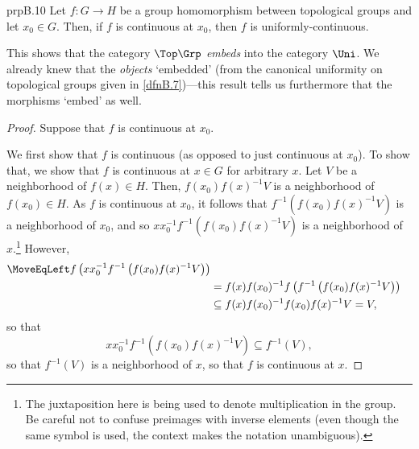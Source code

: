 \begin{prp}{}{prpB.10}
Let $f\colon G\rightarrow H$ be a group homomorphism between topological groups and let $x_0\in G$.  Then, if $f$ is continuous at $x_0$, then $f$ is uniformly-continuous.
\begin{rmk}
This shows that the category $\Top \Grp$ \emph{embeds} into the category $\Uni$.  We already knew that the \emph{objects} `embedded' (from the canonical uniformity on topological groups given in \cref{dfnB.7})---this result tells us furthermore that the morphisms `embed' as well.
\end{rmk}
\begin{proof}
Suppose that $f$ is continuous at $x_0$.

We first show that $f$ is continuous (as opposed to just continuous at $x_0$).  To show that, we show that $f$ is continuous at $x\in G$ for arbitrary $x$.  Let $V$ be a neighborhood of $f(x)\in H$.  Then, $f(x_0)f(x)^{-1}V$ is a neighborhood of $f(x_0)\in H$.  As $f$ is continuous at $x_0$, it follows that $f^{-1}\left( f(x_0)f(x)^{-1}V\right)$ is a neighborhood of $x_0$, and so $xx_0^{-1}f^{-1}\left( f(x_0)f(x)^{-1}V\right)$ is a neighborhood of $x$.\footnote{The juxtaposition here is being used to denote multiplication in the group.  Be careful not to confuse preimages with inverse elements (even though the same symbol is used, the context makes the notation unambiguous).}  However,
\begin{equation}
\begin{split}
\MoveEqLeft
f\left( xx_0^{-1}f^{-1}\left( f(x_0)f(x)^{-1}V\right) \right) \\
& =f(x)f(x_0)^{-1}f\left( f^{-1}\left( f(x_0)f(x)^{-1}V\right) \right) \\
& \subseteq f(x)f(x_0)^{-1}f(x_0)f(x)^{-1}V=V,
\end{split}
\end{equation}
so that
\begin{equation}
xx_0^{-1}f^{-1}\left( f(x_0)f(x)^{-1}V\right) \subseteq f^{-1}(V),
\end{equation}
so that $f^{-1}(V)$ is a neighborhood of $x$, so that $f$ is continuous at $x$.


\end{proof}
\end{prp}
